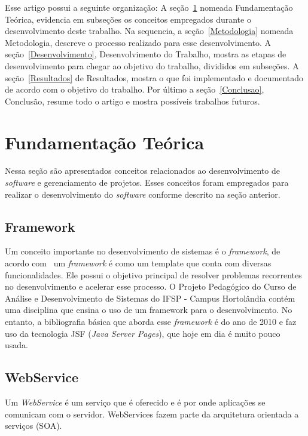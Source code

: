 \documentclass[12pt]{article}
\begin{document}

Esse artigo possui a seguinte organização: A seção~\ref{FundamentacaoTeorica} nomeada Fundamentação Teórica,
evidencia em subseções os conceitos empregados durante o desenvolvimento deste trabalho. Na sequencia,
a seção~\ref{Metodologia} nomeada Metodologia, descreve o processo realizado para esse desenvolvimento.
A seção~\ref{Desenvolvimento}, Desenvolvimento do Trabalho, mostra as etapas de desenvolvimento para chegar ao objetivo do trabalho, divididos em subseções.
A seção~\ref{Resultados} de Resultados, mostra o que foi implementado e documentado de acordo com o objetivo do trabalho.
Por último a seção~\ref{Conclusao}, Conclusão, resume todo o artigo e mostra possíveis trabalhos futuros.

\section{Fundamentação Teórica}\label{FundamentacaoTeorica}

Nessa seção são apresentados conceitos relacionados ao desenvolvimento de \textit{software} e gerenciamento
de projetos. Esses conceitos foram empregados para realizar o desenvolvimento do \textit{software} conforme descrito na seção anterior.

\subsection{Framework}

Um conceito importante no desenvolvimento de sistemas é o \textit{framework}, de acordo com~\cite{host12} um
\textit{framework} é como um template que conta com diversas funcionalidades. Ele possui o objetivo principal de
resolver problemas recorrentes no desenvolvimento e acelerar esse processo. O
Projeto Pedagógico do Curso de Análise e Desenvolvimento de Sistemas do IFSP - Campus Hortolândia
contém uma disciplina que ensina o uso de um framework para o desenvolvimento. No entanto, a bibliografia básica
que aborda esse \textit{framework} é do ano de 2010 e faz uso da tecnologia JSF (\textit{Java Server Pages}), que hoje em dia é muito pouco usada.~\cite{webtechsurveyJSF}

\subsection{WebService}\label{WebService}

Um \textit{WebService} é um serviço que é oferecido e é por onde aplicações se comunicam com o servidor.
WebServices fazem parte da arquitetura orientada a serviços (SOA).
\end{document}
